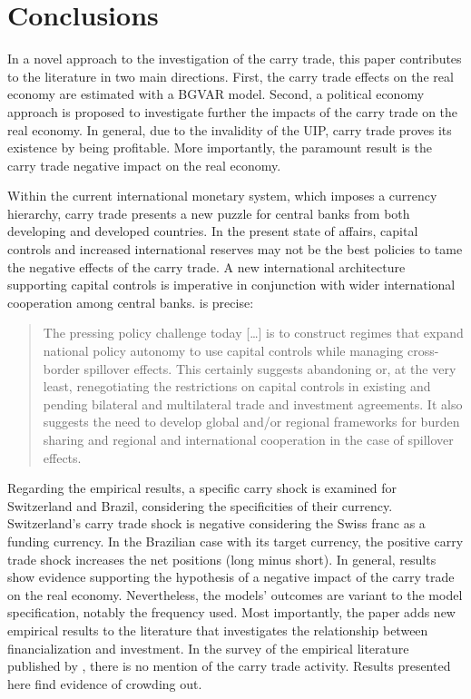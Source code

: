 \documentclass[a4paper, twoside]{templates/ociamthesis}
\begin{document}
\hypertarget{fivefour}{%
\section{Conclusions}\label{fivefour}}

In a novel approach to the investigation of the carry trade, this paper contributes to the literature in two main directions. First, the carry trade effects on the real economy are estimated with a BGVAR model. Second, a political economy approach is proposed to investigate further the impacts of the carry trade on the real economy. In general, due to the invalidity of the UIP, carry trade proves its existence by being profitable. More importantly, the paramount result is the carry trade negative impact on the real economy.

Within the current international monetary system, which imposes a currency hierarchy, carry trade presents a new puzzle for central banks from both developing and developed countries. In the present state of affairs, capital controls and increased international reserves may not be the best policies to tame the negative effects of the carry trade. A new international architecture supporting capital controls is imperative in conjunction with wider international cooperation among central banks. \textcite[ 193]{grabel2018} is precise:

\begin{quote}
The pressing policy challenge today {[}\ldots{]} is to construct regimes that expand national policy autonomy to use capital controls while managing cross-border spillover effects. This certainly suggests abandoning or, at the very least, renegotiating the restrictions on capital controls in existing and pending bilateral and multilateral trade and investment agreements. It also suggests the need to develop global and/or regional frameworks for burden sharing and regional and international cooperation in the case of spillover effects.
\end{quote}

Regarding the empirical results, a specific carry shock is examined for Switzerland and Brazil, considering the specificities of their currency. Switzerland's carry trade shock is negative considering the Swiss franc as a funding currency. In the Brazilian case with its target currency, the positive carry trade shock increases the net positions (long minus short). In general, results show evidence supporting the hypothesis of a negative impact of the carry trade on the real economy. Nevertheless, the models' outcomes are variant to the model specification, notably the frequency used. Most importantly, the paper adds new empirical results to the literature that investigates the relationship between financialization and investment. In the survey of the empirical literature published by \textcite{davis2017}, there is no mention of the carry trade activity. Results presented here find evidence of crowding out.
\end{document}
